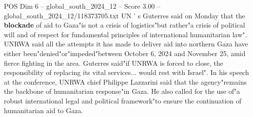 \begin{textsample}{POS Dim 6 – global\_south\_2024\_12 – Score 3.00 – global\_south\_2024\_12/118373705.txt}
UN ' s Guterres said on Monday that the \textbf{blockade} of aid to Gaza"is not a crisis of logistics"but rather"a crisis of political will and of respect for fundamental principles of international humanitarian law".
UNRWA said all the attempts it has made to deliver aid into northern Gaza have either been"denied"or"impeded"between October 6, 2024 and November 25, amid fierce fighting in the area.
Guterres said"if UNRWA is forced to close, the responsibility of replacing its vital services... would rest with Israel".
In his speech at the conference, UNRWA chief Philippe Lazzarini said that the agency"remains the backbone of humanitarian response"in Gaza.
He also called for the use of"a robust international legal and political framework"to ensure the continuation of humanitarian aid to Gaza.

\end{textsample}
